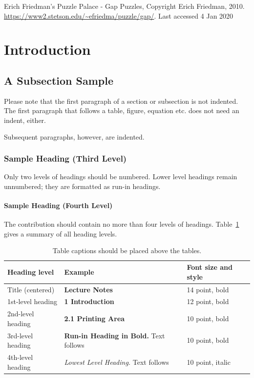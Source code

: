 \documentclass[runningheads]{llncs}
\begin{document}
\begin{thebibliography}{8}
    Erich Friedman's Puzzle Palace - Gap Puzzles, Copyright Erich Friedman, 2010.
    \url{https://www2.stetson.edu/~efriedma/puzzle/gap/}.
    Last accessed 4 Jan 2020
    \end{thebibliography}

























\section{Introduction}
\subsection{A Subsection Sample}
Please note that the first paragraph of a section or subsection is
not indented. The first paragraph that follows a table, figure,
equation etc. does not need an indent, either.

Subsequent paragraphs, however, are indented.

\subsubsection{Sample Heading (Third Level)} Only two levels of
headings should be numbered. Lower level headings remain unnumbered;
they are formatted as run-in headings.

\paragraph{Sample Heading (Fourth Level)}
The contribution should contain no more than four levels of
headings. Table~\ref{tab1} gives a summary of all heading levels.

\begin{table}
\caption{Table captions should be placed above the
tables.}\label{tab1}
\begin{tabular}{|l|l|l|}
\hline
Heading level &  Example & Font size and style\\
\hline
Title (centered) &  {\Large\bfseries Lecture Notes} & 14 point, bold\\
1st-level heading &  {\large\bfseries 1 Introduction} & 12 point, bold\\
2nd-level heading & {\bfseries 2.1 Printing Area} & 10 point, bold\\
3rd-level heading & {\bfseries Run-in Heading in Bold.} Text follows & 10 point, bold\\
4th-level heading & {\itshape Lowest Level Heading.} Text follows & 10 point, italic\\
\hline
\end{tabular}
\end{table}
\end{document}
